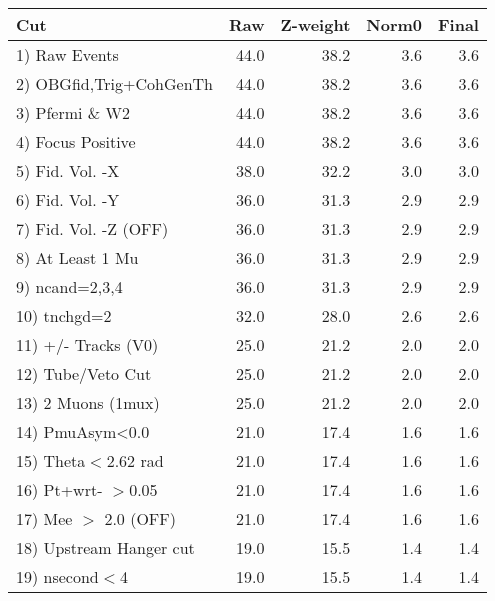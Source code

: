  \begin{table}[h!]\centering
 \begin{tabular}{||l||r|r|r|r||}
 \hline
 \hline
 Cut & Raw & Z-weight & Norm0 & Final \\
 \hline
  1) Raw Events           &        44.0 &        38.2 &         3.6 &         3.6 \\
  2) OBGfid,Trig+CohGenTh &        44.0 &        38.2 &         3.6 &         3.6 \\
  3) Pfermi \& W2         &        44.0 &        38.2 &         3.6 &         3.6 \\
  4) Focus Positive       &        44.0 &        38.2 &         3.6 &         3.6 \\
  5) Fid. Vol. -X         &        38.0 &        32.2 &         3.0 &         3.0 \\
  6) Fid. Vol. -Y         &        36.0 &        31.3 &         2.9 &         2.9 \\
  7) Fid. Vol. -Z (OFF)   &        36.0 &        31.3 &         2.9 &         2.9 \\
  8) At Least 1 Mu        &        36.0 &        31.3 &         2.9 &         2.9 \\
  9) ncand=2,3,4          &        36.0 &        31.3 &         2.9 &         2.9 \\
 10) tnchgd=2             &        32.0 &        28.0 &         2.6 &         2.6 \\
 11) +/- Tracks (V0)      &        25.0 &        21.2 &         2.0 &         2.0 \\
 12) Tube/Veto Cut        &        25.0 &        21.2 &         2.0 &         2.0 \\
 13) 2 Muons (1mux)       &        25.0 &        21.2 &         2.0 &         2.0 \\
 14) PmuAsym<0.0          &        21.0 &        17.4 &         1.6 &         1.6 \\
 15) Theta$<$2.62 rad     &        21.0 &        17.4 &         1.6 &         1.6 \\
 16) Pt+wrt- $>$0.05      &        21.0 &        17.4 &         1.6 &         1.6 \\
 17) Mee $>$ 2.0  (OFF)   &        21.0 &        17.4 &         1.6 &         1.6 \\
 18) Upstream Hanger cut  &        19.0 &        15.5 &         1.4 &         1.4 \\
 19) nsecond$<$4          &        19.0 &        15.5 &         1.4 &         1.4 \\

\end{tabular}
\end{table}
